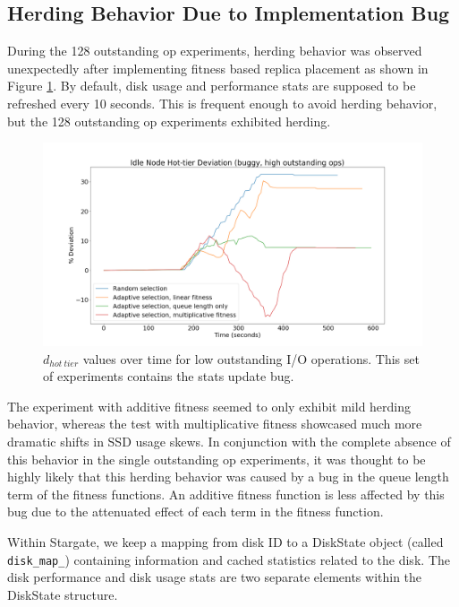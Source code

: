 \documentclass[12pt]{article}
\begin{document}
  \subsection{Herding Behavior Due to Implementation Bug}

  During the 128 outstanding op experiments, herding behavior
  was observed unexpectedly after implementing fitness based replica placement
  as shown in Figure \ref{fig:herding_bug}. By default, disk usage and
  performance stats are supposed to be refreshed every 10 seconds. This is
  frequent enough to avoid herding behavior, but the 128 outstanding op
  experiments exhibited herding.

  \begin{figure}[h]
    \centering
    \includegraphics[scale=0.25]{images/buggy.png} 
    \caption{$d_{hot\ tier}$ values over time for low outstanding I/O
             operations. This set of experiments contains the stats update bug.}
    \label{fig:herding_bug}
  \end{figure}

  The experiment with additive fitness seemed to only exhibit mild herding
  behavior, whereas the test with multiplicative fitness showcased much more
  dramatic shifts in SSD usage skews. In conjunction with the complete absence
  of this behavior in the single outstanding op experiments, it was thought to
  be highly likely that this herding behavior was caused by a bug in the queue
  length term of the fitness functions. An additive fitness function is less
  affected by this bug due to the attenuated effect of each term in the fitness
  function.

  Within Stargate, we keep a mapping from disk ID to a DiskState object (called
  \verb|disk_map_|) containing information and cached statistics related to the
  disk. The disk performance and disk usage stats are two separate elements
  within the DiskState structure.
\end{document}
